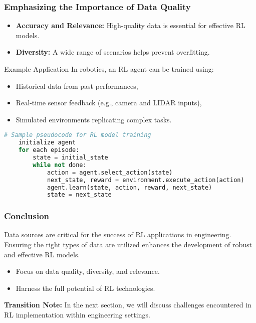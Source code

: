 \documentclass[aspectratio=169]{beamer}
\begin{document}
\begin{frame}[fragile]
    \frametitle{Emphasizing the Importance of Data Quality}
    \begin{itemize}
        \item \textbf{Accuracy and Relevance:} High-quality data is essential for effective RL models.
        \item \textbf{Diversity:} A wide range of scenarios helps prevent overfitting.
    \end{itemize}

    \begin{block}{Example Application}
        In robotics, an RL agent can be trained using:
        \begin{itemize}
            \item Historical data from past performances,
            \item Real-time sensor feedback (e.g., camera and LIDAR inputs),
            \item Simulated environments replicating complex tasks.
        \end{itemize}
    \end{block}

    \begin{lstlisting}[language=Python]
    # Sample pseudocode for RL model training
    initialize agent
    for each episode:
        state = initial_state
        while not done:
            action = agent.select_action(state)
            next_state, reward = environment.execute_action(action)
            agent.learn(state, action, reward, next_state)
            state = next_state
    \end{lstlisting}
\end{frame}

\begin{frame}[fragile]
    \frametitle{Conclusion}
    Data sources are critical for the success of RL applications in engineering. Ensuring the right types of data are utilized enhances the development of robust and effective RL models. 
    \begin{itemize}
        \item Focus on data quality, diversity, and relevance.
        \item Harness the full potential of RL technologies.
    \end{itemize}
    
    \textbf{Transition Note:} In the next section, we will discuss challenges encountered in RL implementation within engineering settings.
\end{frame}
\end{document}

